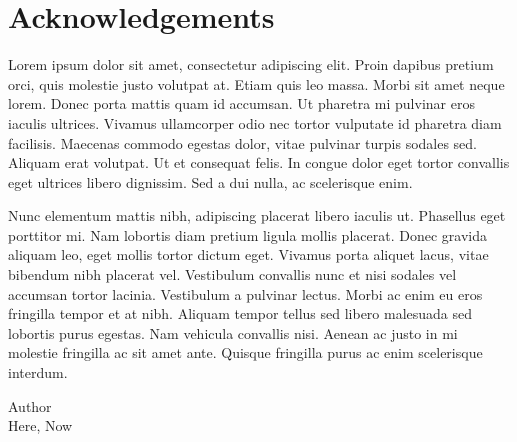 \chapter*{Acknowledgements}

Lorem ipsum dolor sit amet, consectetur adipiscing elit. Proin dapibus pretium orci, quis molestie justo volutpat at. Etiam quis leo massa. Morbi sit amet neque lorem. Donec porta mattis quam id accumsan. Ut pharetra mi pulvinar eros iaculis ultrices. Vivamus ullamcorper odio nec tortor vulputate id pharetra diam facilisis. Maecenas commodo egestas dolor, vitae pulvinar turpis sodales sed. Aliquam erat volutpat. Ut et consequat felis. In congue dolor eget tortor convallis eget ultrices libero dignissim. Sed a dui nulla, ac scelerisque enim.

Nunc elementum mattis nibh, adipiscing placerat libero iaculis ut. Phasellus eget porttitor mi. Nam lobortis diam pretium ligula mollis placerat. Donec gravida aliquam leo, eget mollis tortor dictum eget. Vivamus porta aliquet lacus, vitae bibendum nibh placerat vel. Vestibulum convallis nunc et nisi sodales vel accumsan tortor lacinia. Vestibulum a pulvinar lectus. Morbi ac enim eu eros fringilla tempor et at nibh. Aliquam tempor tellus sed libero malesuada sed lobortis purus egestas. Nam vehicula convallis nisi. Aenean ac justo in mi molestie fringilla ac sit amet ante. Quisque fringilla purus ac enim scelerisque interdum.

\begin{flushright}
Author\\ \vspace{.3cm} Here, Now
\end{flushright}
